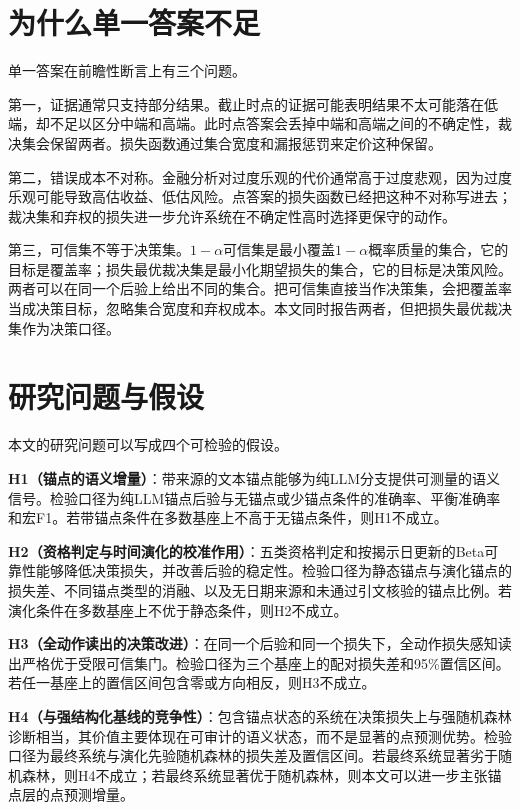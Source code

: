 \section{为什么单一答案不足}

单一答案在前瞻性断言上有三个问题。

第一，证据通常只支持部分结果。截止时点的证据可能表明结果不太可能落在低端，却不足以区分中端和高端。此时点答案会丢掉中端和高端之间的不确定性，裁决集会保留两者。损失函数通过集合宽度和漏报惩罚来定价这种保留。

第二，错误成本不对称。金融分析对过度乐观的代价通常高于过度悲观，因为过度乐观可能导致高估收益、低估风险。点答案的损失函数已经把这种不对称写进去；裁决集和弃权的损失进一步允许系统在不确定性高时选择更保守的动作。

第三，可信集不等于决策集。$1-\alpha$可信集是最小覆盖$1-\alpha$概率质量的集合，它的目标是覆盖率；损失最优裁决集是最小化期望损失的集合，它的目标是决策风险。两者可以在同一个后验上给出不同的集合。把可信集直接当作决策集，会把覆盖率当成决策目标，忽略集合宽度和弃权成本。本文同时报告两者，但把损失最优裁决集作为决策口径。

\section{研究问题与假设}

本文的研究问题可以写成四个可检验的假设。

\textbf{H1（锚点的语义增量）}：带来源的文本锚点能够为纯LLM分支提供可测量的语义信号。检验口径为纯LLM锚点后验与无锚点或少锚点条件的准确率、平衡准确率和宏F1。若带锚点条件在多数基座上不高于无锚点条件，则H1不成立。

\textbf{H2（资格判定与时间演化的校准作用）}：五类资格判定和按揭示日更新的Beta可靠性能够降低决策损失，并改善后验的稳定性。检验口径为静态锚点与演化锚点的损失差、不同锚点类型的消融、以及无日期来源和未通过引文核验的锚点比例。若演化条件在多数基座上不优于静态条件，则H2不成立。

\textbf{H3（全动作读出的决策改进）}：在同一个后验和同一个损失下，全动作损失感知读出严格优于受限可信集门。检验口径为三个基座上的配对损失差和95\%置信区间。若任一基座上的置信区间包含零或方向相反，则H3不成立。

\textbf{H4（与强结构化基线的竞争性）}：包含锚点状态的系统在决策损失上与强随机森林诊断相当，其价值主要体现在可审计的语义状态，而不是显著的点预测优势。检验口径为最终系统与演化先验随机森林的损失差及置信区间。若最终系统显著劣于随机森林，则H4不成立；若最终系统显著优于随机森林，则本文可以进一步主张锚点层的点预测增量。

